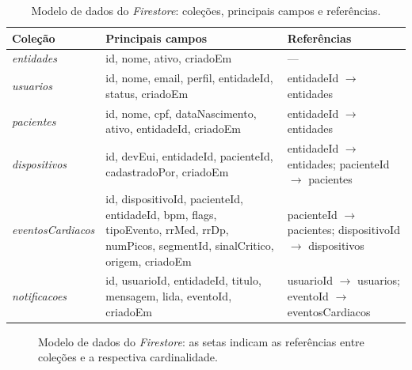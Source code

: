 \begin{table}[h]
    \centering
    \caption{Modelo de dados do \textit{Firestore}: coleções, principais campos e referências.}
    \small
    \begin{tabular}{l|>{\arraybackslash}m{6.7cm}|>{\arraybackslash}m{3.1cm}}
        \textbf{Coleção} & \textbf{Principais campos} & \textbf{Referências} \\ \hline
        \textit{entidades} & id, nome, ativo, criadoEm & --- \\ \hline
        \textit{usuarios} & id, nome, email, perfil, entidadeId, status, criadoEm & entidadeId $\rightarrow$ entidades \\ \hline
        \textit{pacientes} & id, nome, cpf, dataNascimento, ativo, entidadeId, criadoEm & entidadeId $\rightarrow$ entidades \\ \hline
        \textit{dispositivos} & id, devEui, entidadeId, pacienteId, cadastradoPor, criadoEm & entidadeId $\rightarrow$ entidades; pacienteId $\rightarrow$ pacientes \\ \hline
        \textit{eventosCardiacos} & id, dispositivoId, pacienteId, entidadeId, bpm, flags, tipoEvento, rrMed, rrDp, numPicos, segmentId, sinalCritico, origem, criadoEm & pacienteId $\rightarrow$ pacientes; dispositivoId $\rightarrow$ dispositivos \\ \hline
        \textit{notificacoes} & id, usuarioId, entidadeId, titulo, mensagem, lida, eventoId, criadoEm & usuarioId $\rightarrow$ usuarios; eventoId $\rightarrow$ eventosCardiacos \\ \hline
    \end{tabular}
    \label{tab:colecoes}
\end{table}

\begin{figure}[ht]
    \centering
    \caption{Modelo de dados do \textit{Firestore}: as setas indicam as referências entre coleções e a respectiva cardinalidade.}
    \label{fig:modeloFirestore}
\end{figure}

